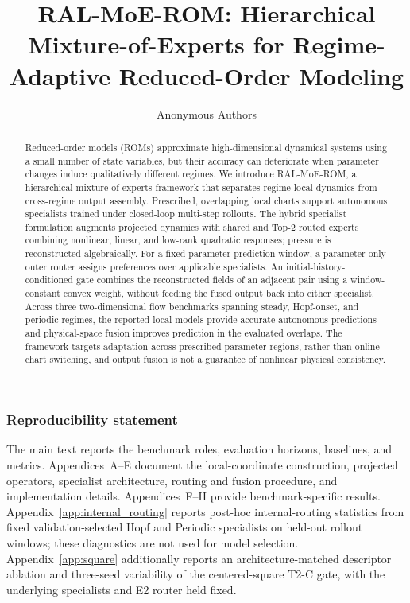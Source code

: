 \documentclass{article}
\title{RAL-MoE-ROM: Hierarchical Mixture-of-Experts for Regime-Adaptive Reduced-Order Modeling}
\author{Anonymous Authors}
\begin{document}
\raggedbottom

\maketitle

\begin{abstract}
Reduced-order models (ROMs) approximate high-dimensional dynamical systems using a small number of state variables, but their accuracy can deteriorate when parameter changes induce qualitatively different regimes. We introduce RAL-MoE-ROM, a hierarchical mixture-of-experts framework that separates regime-local dynamics from cross-regime output assembly. Prescribed, overlapping local charts support autonomous specialists trained under closed-loop multi-step rollouts. The hybrid specialist formulation augments projected dynamics with shared and Top-2 routed experts combining nonlinear, linear, and low-rank quadratic responses; pressure is reconstructed algebraically. For a fixed-parameter prediction window, a parameter-only outer router assigns preferences over applicable specialists. An initial-history-conditioned gate combines the reconstructed fields of an adjacent pair using a window-constant convex weight, without feeding the fused output back into either specialist. Across three two-dimensional flow benchmarks spanning steady, Hopf-onset, and periodic regimes, the reported local models provide accurate autonomous predictions and physical-space fusion improves prediction in the evaluated overlaps. The framework targets adaptation across prescribed parameter regions, rather than online chart switching, and output fusion is not a guarantee of nonlinear physical consistency.
\end{abstract}





\FloatBarrier


\subsubsection*{Reproducibility statement}
The main text reports the benchmark roles, evaluation horizons, baselines, and metrics. Appendices~A--E document the local-coordinate construction, projected operators, specialist architecture, routing and fusion procedure, and implementation details. Appendices~F--H provide benchmark-specific results.
Appendix~\ref{app:internal_routing} reports post-hoc internal-routing statistics
from fixed validation-selected Hopf and Periodic specialists on held-out
rollout windows; these diagnostics are not used for model selection.
Appendix~\ref{app:square} additionally reports an architecture-matched descriptor
ablation and three-seed variability of the centered-square T2-C gate, with the
underlying specialists and E2 router held fixed.
\end{document}
